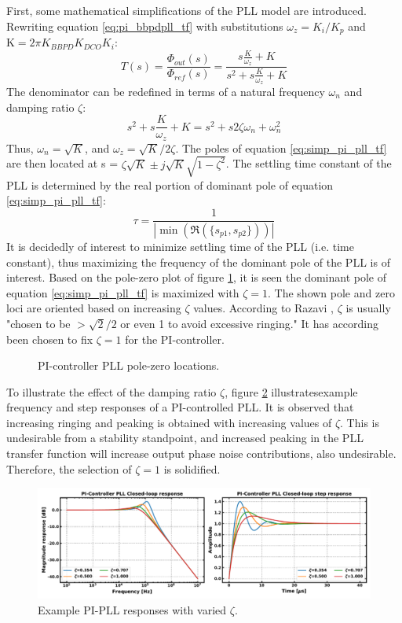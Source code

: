 			First, some mathematical simplifications of the PLL model are introduced. Rewriting equation \ref{eq:pi_bbpdpll_tf} with substitutions $\omega_z = K_i/K_p$ and $\mathrm{K} = 2\pi K_{BBPD}K_{DCO}K_{i}$:
			\begin{equation} \label{eq:simp_pi_pll_tf}
				T(s) = \frac{\Phi_{out}(s)}{\Phi_{ref}(s)} = \frac{s\frac{K}{\omega_z} + K }{s^2 + s\frac{K}{\omega_z} + K}
			\end{equation}
			The denominator can be redefined in terms of a natural frequency $\omega_n$ and damping ratio $\zeta$:
			\begin{equation}
				s^2 + s\frac{K}{\omega_z} + K = s^2 + s2\zeta\omega_n + \omega_n^2
			\end{equation}
			Thus, $\omega_n = \sqrt{K}$, and $\omega_z = \sqrt{K}/2\zeta$. The poles of equation \ref{eq:simp_pi_pll_tf} are then located at s = $\zeta\sqrt{K} \pm j\sqrt{K}\sqrt{1-\zeta^2}$. The settling time constant of the PLL is determined by the real portion of dominant pole of equation \ref{eq:simp_pi_pll_tf}:
			\begin{equation}
				\tau = \frac{1}{|\min(\Re(\{s_{p1}, s_{p2}\}))|}
			\end{equation}
			 It is decidedly of interest to minimize settling time of the PLL (i.e. time constant), thus maximizing the frequency of the dominant pole of the PLL is of interest. Based on the pole-zero plot of figure \ref{fig:pi_pll_pz}, it is seen the dominant pole of equation \ref{eq:simp_pi_pll_tf} is maximized with $\zeta=1$. The shown pole and zero loci are oriented based on increasing $\zeta$ values. According to Razavi \cite{razavi_2017}, $\zeta$ is usually 
			"chosen to be $>\sqrt{2}/2$ or even 1 to avoid excessive ringing." It has according been chosen to fix $\zeta=1$ for the PI-controller. 
			\begin{figure}[htb!]
				\center
				\caption{PI-controller PLL pole-zero locations.}
				\label{fig:pi_pll_pz}
			\end{figure}
			\FloatBarrier
			To illustrate the effect of the damping ratio $\zeta$, figure \ref{fig:pi_pll_response} illustratesexample frequency and step responses of a PI-controlled PLL. It is observed that increasing ringing and peaking is obtained with increasing values of $\zeta$. This is undesirable from a stability standpoint, and increased peaking in the PLL transfer function will increase output phase noise contributions, also undesirable. Therefore, the selection of $\zeta=1$ is solidified.
			\begin{figure}[htb!]
				\center\includegraphics[width=1.0\textwidth, angle=0]{figs/pi_pll_response.pdf}
				\caption{Example PI-PLL responses with varied $\zeta$.}
				\label{fig:pi_pll_response}
			\end{figure}
